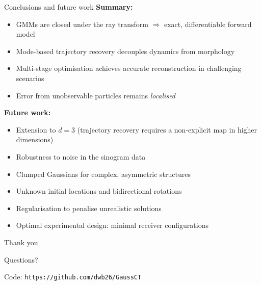 \documentclass{beamer}
\begin{document}
    \begin{frame}{Conclusions and future work}
        \textbf{Summary:}
        \begin{itemize}
            \item GMMs are closed under the ray transform $\Rightarrow$ exact, differentiable forward model
            \item Mode-based trajectory recovery decouples dynamics from morphology
            \item Multi-stage optimisation achieves accurate reconstruction in challenging scenarios
            \item Error from unobservable particles remains \emph{localised}
        \end{itemize}

        \vspace{0.5em}
        \pause
        \textbf{Future work:}
        \begin{itemize}
            \item Extension to $d = 3$ (trajectory recovery requires a non-explicit map in higher dimensions)
            \item Robustness to noise in the sinogram data
            \item Clumped Gaussians for complex, asymmetric structures
            \item Unknown initial locations and bidirectional rotations
            \item Regularisation to penalise unrealistic solutions
            \item Optimal experimental design: minimal receiver configurations
        \end{itemize}

    \end{frame}

    \begin{frame}[plain]
        \centering
        \vspace{2cm}
        {\Huge Thank you}

        \vspace{1.5cm}
        {\large Questions?}

        \vspace{1.5cm}
        {\small Code: \texttt{https://github.com/dwb26/GaussCT}}
    \end{frame}
\end{document}
